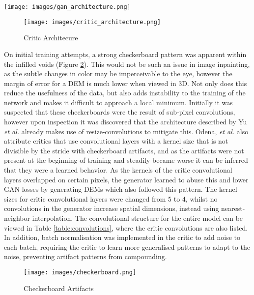 \documentclass[twocolumn]{article}
\begin{document}
\begin{figure*}
\centering
\texttt{[image: images/gan\_architecture.png]}
\caption{\label{fig:generator}Generator Architecure}
\end{figure*}

\begin{figure}[htbp]
\centering
\texttt{[image: images/critic\_architecture.png]}
\caption{\label{fig:critic}Critic Architecure}
\end{figure}

On initial training attempts, a strong checkerboard pattern was apparent within the infilled voids (Figure \ref{fig:checkerboard}).
This would not be such an issue in image inpainting, as the subtle changes in color may be imperceivable to the eye, however the margin of error for a DEM is much lower when viewed in 3D.
Not only does this reduce the usefulness of the data, but also adds instability to the training of the network and makes it difficult to approach a local minimum.
Initially it was suspected that these checkerboards were the result of sub-pixel convolutions\autocite{aitkenCheckerboardArtifactFree2017}, however upon inspection it was discovered that the architecture described by Yu \emph{et al.} already makes use of resize-convolutions\autocite{odenaDeconvolutionCheckerboardArtifacts2016} to mitigate this.
Odena, \emph{et al.}\autocite{odenaDeconvolutionCheckerboardArtifacts2016} also attribute critics that use convolutional layers with a kernel size that is not divisible by the stride with checkerboard artifacts, and as the artifacts were not present at the beginning of training and steadily became worse it can be inferred that they were a learned behavior.
As the kernels of the critic convolutional layers overlapped on certain pixels, the generator learned to abuse this and lower GAN losses by generating DEMs which also followed this pattern.
The kernel sizes for critic convolutional layers were changed from 5 to 4, whilst no convolutions in the generator increase spatial dimensions, instead using nearest-neighbor interpolation.
The convolutional structure for the entire model can be viewed in Table \ref{table:convolutions}, where the critic convolutions are also listed.
In addition, batch normalisation was implemented in the critic to add noise to each batch, requiring the critic to learn more generalised patterns to adapt to the noise, preventing artifact patterns from compounding.

\begin{figure}[htbp]
\centering
\texttt{[image: images/checkerboard.png]}
\caption{\label{fig:checkerboard}Checkerboard Artifacts}
\end{figure}
\end{document}
